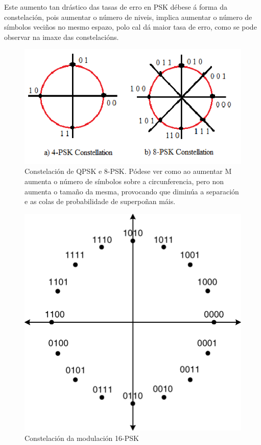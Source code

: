 \documentclass[
	10pt, %
	spanish, %
]{fphw}
\begin{document}
Este aumento tan drástico das tasas de erro en PSK débese á forma da constelación, pois aumentar o número de niveis, implica aumentar o número de símbolos veciños no mesmo espazo, polo cal dá maior tasa de erro, como se pode observar na imaxe das constelacións.
\begin{figure}[htb]
\centering
\includegraphics{4_8_psk_const.png}
\caption{Constelación de QPSK e 8-PSK. Pódese ver como ao aumentar M aumenta o número de símbolos sobre a circunferencia, pero non aumenta o tamaño da mesma, provocando que diminúa a separación e as colas de probabilidade de superpoñan máis.}
\end{figure}
\begin{figure}[htb]
\centering
\includegraphics[scale=0.5]{psk_16_const.png}
\caption{Constelación da modulación 16-PSK}
\end{figure}
\end{document}
